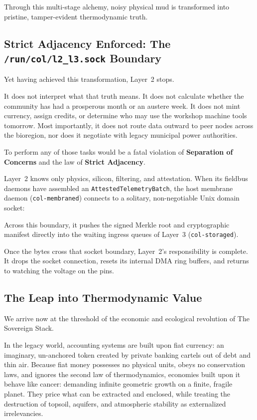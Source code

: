 Through this multi-stage alchemy, noisy physical mud is transformed into pristine, tamper-evident thermodynamic truth.

\subsection{Strict Adjacency Enforced: The \texttt{/run/col/l2\_l3.sock} Boundary}

Yet having achieved this transformation, Layer~2 stops.

It does not interpret what that truth means. It does not calculate whether the community has had a prosperous month or an austere week. It does not mint currency, assign credits, or determine who may use the workshop machine tools tomorrow. Most importantly, it does not route data outward to peer nodes across the bioregion, nor does it negotiate with legacy municipal power authorities.

To perform any of those tasks would be a fatal violation of \textbf{Separation of Concerns} and the law of \textbf{Strict Adjacency}.

Layer~2 knows only physics, silicon, filtering, and attestation. When its fieldbus daemons have assembled an \texttt{AttestedTelemetryBatch}, the host membrane daemon (\texttt{col-membraned}) connects to a solitary, non-negotiable Unix domain socket:
\begin{center}
\end{center}
Across this boundary, it pushes the signed Merkle root and cryptographic manifest directly into the waiting ingress queues of Layer~3 (\texttt{col-storaged}). 

Once the bytes cross that socket boundary, Layer~2's responsibility is complete. It drops the socket connection, resets its internal DMA ring buffers, and returns to watching the voltage on the pins.

\subsection{The Leap into Thermodynamic Value}

We arrive now at the threshold of the economic and ecological revolution of The Sovereign Stack.

In the legacy world, accounting systems are built upon fiat currency: an imaginary, un-anchored token created by private banking cartels out of debt and thin air. Because fiat money possesses no physical units, obeys no conservation laws, and ignores the second law of thermodynamics, economies built upon it behave like cancer: demanding infinite geometric growth on a finite, fragile planet. They price what can be extracted and enclosed, while treating the destruction of topsoil, aquifers, and atmospheric stability as externalized irrelevancies.

